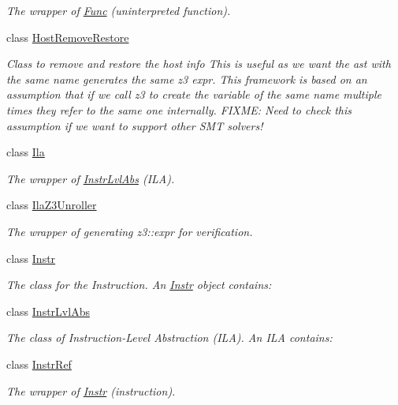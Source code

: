 \begin{DoxyCompactItemize}
\begin{DoxyCompactList}\small\item\em The wrapper of \mbox{\hyperlink{classilang_1_1_func}{Func}} (uninterpreted function). \end{DoxyCompactList}\item 
class \mbox{\hyperlink{classilang_1_1_host_remove_restore}{Host\+Remove\+Restore}}
\begin{DoxyCompactList}\small\item\em Class to remove and restore the host info This is useful as we want the ast with the same name generates the same z3 expr. This framework is based on an assumption that if we call z3 to create the variable of the same name multiple times they refer to the same one internally. F\+I\+X\+ME\+: Need to check this assumption if we want to support other S\+MT solvers! \end{DoxyCompactList}\item 
class \mbox{\hyperlink{classilang_1_1_ila}{Ila}}
\begin{DoxyCompactList}\small\item\em The wrapper of \mbox{\hyperlink{classilang_1_1_instr_lvl_abs}{Instr\+Lvl\+Abs}} (I\+LA). \end{DoxyCompactList}\item 
class \mbox{\hyperlink{classilang_1_1_ila_z3_unroller}{Ila\+Z3\+Unroller}}
\begin{DoxyCompactList}\small\item\em The wrapper of generating z3\+::expr for verification. \end{DoxyCompactList}\item 
class \mbox{\hyperlink{classilang_1_1_instr}{Instr}}
\begin{DoxyCompactList}\small\item\em The class for the Instruction. An \mbox{\hyperlink{classilang_1_1_instr}{Instr}} object contains\+: \end{DoxyCompactList}\item 
class \mbox{\hyperlink{classilang_1_1_instr_lvl_abs}{Instr\+Lvl\+Abs}}
\begin{DoxyCompactList}\small\item\em The class of Instruction-\/\+Level Abstraction (I\+LA). An I\+LA contains\+: \end{DoxyCompactList}\item 
class \mbox{\hyperlink{classilang_1_1_instr_ref}{Instr\+Ref}}
\begin{DoxyCompactList}\small\item\em The wrapper of \mbox{\hyperlink{classilang_1_1_instr}{Instr}} (instruction). \end{DoxyCompactList}\item 

\end{DoxyCompactItemize}
